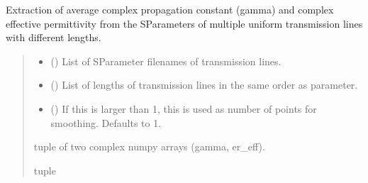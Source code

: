 \documentclass[letterpaper,10pt,english]{sphinxmanual}
\begin{document}

\begin{fulllineitems}
\label{\detokenize{touchstone:touchstone.extract_gamma_ereff_all}}
\pysigstartsignatures
{}
\pysigstopsignatures
\sphinxAtStartPar
Extraction of average complex propagation constant (gamma) and complex effective permittivity from the S\sphinxhyphen{}Parameters of multiple uniform transmission lines with different lengths.
\begin{quote}\begin{description}
\begin{itemize}
\item {}
\sphinxAtStartPar
{} () \textendash{} List of S\sphinxhyphen{}Parameter filenames of transmission lines.

\item {}
\sphinxAtStartPar
{} () \textendash{} List of lengths of transmission lines in the same order as  parameter.

\item {}
\sphinxAtStartPar
{} (\sphinxstyleliteralemphasis{\sphinxupquote{, }}) \textendash{} If this is larger than 1, this is used as number of points for smoothing. Defaults to 1.

\end{itemize}

\sphinxAtStartPar
tuple of two complex numpy arrays (gamma, er\_eff).

\sphinxAtStartPar
tuple

\end{description}\end{quote}

\end{fulllineitems}

\end{document}
